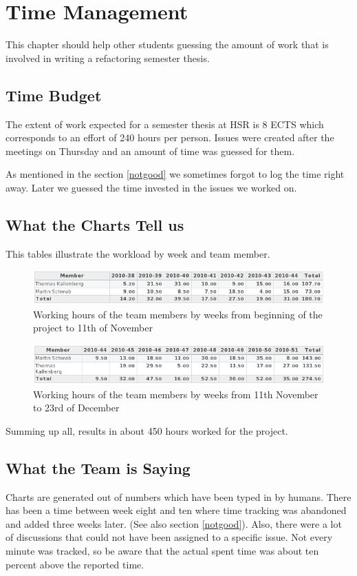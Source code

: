 \chapter{Time Management}
\thispagestyle{fancy}
This chapter should help other students guessing the amount of work that is 
involved in writing a refactoring semester thesis.

\section{Time Budget}
The extent of work expected for a semester thesis at HSR is 8 ECTS which 
corresponds to an effort of 240 hours per person. Issues were created after 
the meetings on Thursday and an amount of time was guessed for them.

As mentioned in the section \ref{notgood} we sometimes forgot to log the time
right away. Later we guessed the time invested in the issues we worked on.

\section{What the Charts Tell us}
This tables illustrate the workload by week and team member.

\begin{figure}[h]
\includegraphics[width=1\textwidth]{images/timetable1.png}
\caption{Working hours of the team members by weeks from beginning of the
project to 11th of November}
\label{timetable1}
\end{figure}

\begin{figure}[h]
\includegraphics[width=1\textwidth]{images/timetable2.png}
\caption{Working hours of the team members by weeks from 11th November to 23rd
of December}
\label{timetable2}
\end{figure}

Summing up all, results in about 450 hours worked for the project.

\section{What the Team is Saying}
Charts are generated out of numbers which have been typed in by humans. There 
has been a time between week eight and ten where time tracking was abandoned and 
added three weeks later. (See also section \ref{notgood}). Also, there were a
lot of discussions that could not have been assigned to a specific issue. Not
every minute was tracked, so be aware that the actual spent time was about ten
percent above the reported time.
